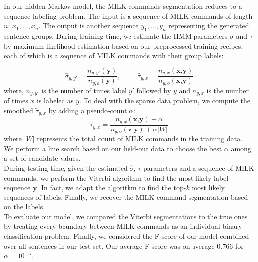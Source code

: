 \documentclass[11pt]{article}
\begin{document}

In our hidden Markov model, the MILK commands segmentation reduces to a sequence labeling problem. The input is a sequence of MILK commands of length $n$: $x_1,\dots, x_n$. The output is another sequence $y_1, \dots, y_n$ representing the generated sentence groups. During training time, we estimate the HMM parameters $\sigma$ and $\tau$ by maximum likelihood estimation based on our preprocessed training recipes, each of which is a sequence of MILK commands with their group labels:

$$\hat{\sigma}_{y,y'} = \frac{n_{y,y'}(\textbf{y})}{n_{y,o}(\textbf{y})}, \,\,\,\,\,\,\,\,\,\,\,\,\,\,\,
\hat{\tau}_{y,x} = \frac{n_{y,x}(\textbf{x,y})}{n_{y,o}(\textbf{x,y})}$$
where, $n_{y,y'}$ is the number of times label $y'$ followed by $y$ and $n_{y,x}$ is the number of times $x$ is labeled as $y$. To deal with the sparse data problem, we compute the smoothed $\tilde{\tau}_{y,x}$ by adding a pseudo-count $\alpha$:
$$\tilde{\tau}_{y,x} = \frac{n_{y,x}(\textbf{x,y})+\alpha}{n_{y,o}(\textbf{x,y})+\alpha|W|}$$
where $|W|$ represents the total count of MILK commands in the training data. We perform a line search based on our held-out data to choose the best $\alpha$ among a set of candidate values.\\

During testing time, given the estimated $\hat{\sigma}$, $\tilde{\tau}$ parameters and a sequence of MILK commands, we perform the Viterbi algorithm to find the most likely label sequence $\textbf{y}$. In fact, we adapt the algorithm to find the top-$k$ most likely sequences of labels.
Finally, we recover the MILK command segmentation based on the labels.
\\

To evaluate our model, we compared the Viterbi segmentations to the true ones by treating every boundary between MILK commands as an individual binary classification problem. Finally, we considered the F-score of our model combined over all sentences in our test set. Our average F-score was on average 0.766 for $\alpha=10^{-5}$.\\
\end{document}
